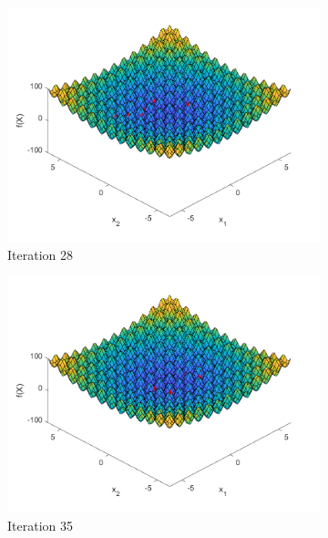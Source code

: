 \begin{figure}
\begin{subfigure}[b]{0.4\textwidth}
    \includegraphics[width=\textwidth]{img/smpl/rast2d/loa-iter-28}
    \caption{Iteration 28}
    \label{fig:s4-iter-4}
  \end{subfigure}
  \begin{subfigure}[b]{0.4\textwidth}
    \includegraphics[width=\textwidth]{img/smpl/rast2d/loa-iter-35}
    \caption{Iteration 35}
    \label{fig:s4-iter-5}
  \end{subfigure}
  \begin{subfigure}[b]{0.4\textwidth}

\end{subfigure}
\end{figure}
